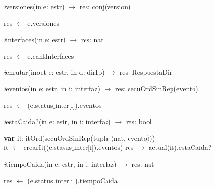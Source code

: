 \textit{i}versiones(in e: estr) $\longrightarrow$ res: conj(version)\\
\begin{algorithm}[H]
\BlankLine
res $\leftarrow$ e.versiones
\end{algorithm}


\textit{i}interfaces(in e: estr) $\longrightarrow$ res: nat\\
\begin{algorithm}[H]
\BlankLine
res $\leftarrow$ e.cantInterfaces 
\end{algorithm}



\textit{i}enrutar(inout e: estr, in d: dirIp) $\longrightarrow$ res: RespuestaDir\\
\begin{algorithm}[H]
\BlankLine
{}
\end{algorithm}



\textit{i}eventos(in e: estr, in i: interfaz) $\longrightarrow$ res: secuOrdSinRep(evento)\\
\begin{algorithm}[H]
\BlankLine
res $\leftarrow$ (e.status$\_$inter[i]).eventos
\end{algorithm}


\textit{i}estaCaida?(in e: estr, in i: interfaz) $\longrightarrow$ res: bool\\
\begin{algorithm}[H]
\BlankLine
\textbf{var} it: itOrd(secuOrdSinRep(tupla $\langle$nat, evento$\rangle$)) \\
\BlankLine
it $\leftarrow$ crearIt((e.status$\_$inter[i]).eventos) 
\BlankLine
res $\rightarrow$ actual(it).estaCaida? 
\end{algorithm}



\textit{i}tiempoCaida(in e: estr, in i: interfaz) $\longrightarrow$ res: nat \\
\begin{algorithm}[H]
\BlankLine
res $\leftarrow$ (e.status$\_$inter[i]).tiempoCaida 
\end{algorithm}